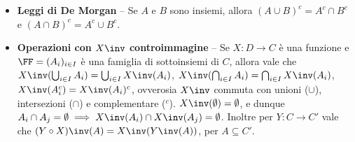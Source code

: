 \begin{multicols*}{2}
\begin{itemize}
    \item \textbf{Leggi di De Morgan} -- Se $A$ e $B$ sono insiemi, allora
    $(A \cup B)^c = A^c \cap B^c$ e $(A \cap B)^c = A^c \cup B^c$.
    \item \textbf{Operazioni con $X\inv$ controimmagine} -- Se $X : D \to C$ è
    una funzione e $\FF = (A_i)_{i \in I}$ è una famiglia di sottoinsiemi di $C$, allora vale che $X\inv(\bigcup_{i \in I} A_i) = \bigcup_{i \in I} X\inv(A_i)$,
    $X\inv(\bigcap_{i \in I} A_i) = \bigcap_{i \in I} X\inv(A_i)$,
    $X\inv(A_i^c) = X\inv(A_i)^c$, ovverosia $X\inv$ commuta con unioni ($\cup$),
    intersezioni ($\cap$) e complementare ($^c$). $X\inv(\emptyset) = \emptyset$, e dunque $A_i \cap A_j = \emptyset \implies X\inv(A_i) \cap X\inv(A_j) = \emptyset$.
    Inoltre per $Y : C \to C'$ vale che $(Y \circ X)\inv(A) = X\inv(Y\inv(A))$,
    per $A \subseteq C'$.
\end{itemize}

\end{multicols*}